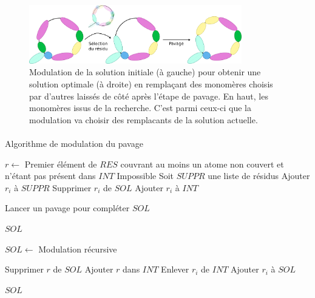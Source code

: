 \documentclass[12pt,french,twoside]{report}
\begin{document}
\begin{figure}[!h]
  \begin{center}
    \includegraphics[width=350px]{Figures/s2m/pavage/modulation.png}
    \caption{\label{modulation}Modulation de la solution initiale (à gauche) pour obtenir une solution optimale (à droite) en remplaçant des monomères choisis par d'autres laissés de côté après l'étape de pavage.
    En haut, les monomères issus de la recherche.
    C'est parmi ceux-ci que la modulation va choisir des remplacants de la solution actuelle.}
  \end{center}
\end{figure}

\paragraph{}
\begin{algorithm}[H]
  \caption{Algorithme de modulation du pavage}
  
  $r \gets$ Premier élément de $RES$ couvrant au moins un atome non couvert et n'étant pas présent dans $INT$\;
   {
    \KwRet Impossible\;
  }
  Soit $SUPPR$ une liste de résidus\;
   {
     {
      Ajouter $r_i$ à $SUPPR$\;
      Supprimer $r_i$ de $SOL$\;
      Ajouter $r_i$ à $INT$\;
    }
  }
  
  Lancer un pavage pour compléter $SOL$\;
  
   {
    \KwRet $SOL$\;
  }
  
  $SOL \gets$ Modulation récursive\;
  
   {
    Supprimer $r$ de $SOL$\;
    Ajouter $r$ dans $INT$\;
     {
      Enlever $r_i$ de $INT$\;
      Ajouter $r_i$ à $SOL$\;
    }
  }
  
  \KwRet $SOL$\;
\end{algorithm}
\end{document}
